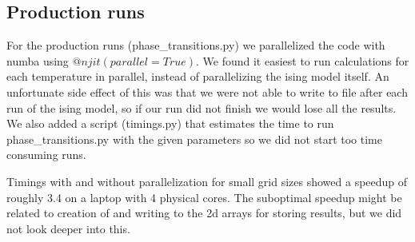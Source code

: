 \subsection{Production runs}

For the production runs (phase\_transitions.py) we parallelized the code with
numba using $@njit(parallel=True)$. We found it easiest to run calculations for
each temperature in parallel, instead of parallelizing the ising model itself.
An unfortunate side effect of this was that we were not able to write to file
after each run of the ising model, so if our run did not finish we would lose
all the results. We also added a script (timings.py) that estimates the time to
run phase\_transitions.py with the given parameters so we did not start too time
consuming runs.

Timings with and without parallelization for small grid sizes showed a speedup
of roughly 3.4 on a laptop with 4 physical cores. The suboptimal speedup might
be related to creation of and writing to the 2d arrays for storing results,
but we did not look deeper into this.
